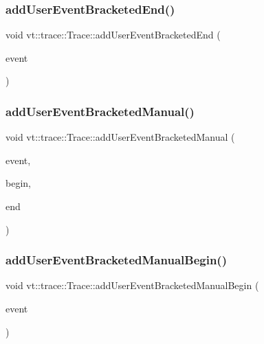 \subsubsection{\texorpdfstring{add\+User\+Event\+Bracketed\+End()}{addUserEventBracketedEnd()}}
{\footnotesize\ttfamily void vt\+::trace\+::\+Trace\+::add\+User\+Event\+Bracketed\+End (\begin{DoxyParamCaption}\item[{\hyperlink{namespacevt_1_1trace_a5908920d051c144c89f17c69ed262350}{User\+Event\+I\+D\+Type}}]{event }\end{DoxyParamCaption})}

\mbox{\label{structvt_1_1trace_1_1_trace_ab0dd676ca3870682b0c52669d3603c11}} 
\subsubsection{\texorpdfstring{add\+User\+Event\+Bracketed\+Manual()}{addUserEventBracketedManual()}}
{\footnotesize\ttfamily void vt\+::trace\+::\+Trace\+::add\+User\+Event\+Bracketed\+Manual (\begin{DoxyParamCaption}\item[{\hyperlink{namespacevt_1_1trace_a70c43e0e1596eea236912d4197d3120a}{User\+Spec\+Event\+I\+D\+Type}}]{event,  }\item[{double}]{begin,  }\item[{double}]{end }\end{DoxyParamCaption})}

\mbox{\label{structvt_1_1trace_1_1_trace_ab6def24560e35a011beb771b2a05894c}} 
\subsubsection{\texorpdfstring{add\+User\+Event\+Bracketed\+Manual\+Begin()}{addUserEventBracketedManualBegin()}}
{\footnotesize\ttfamily void vt\+::trace\+::\+Trace\+::add\+User\+Event\+Bracketed\+Manual\+Begin (\begin{DoxyParamCaption}\item[{\hyperlink{namespacevt_1_1trace_a70c43e0e1596eea236912d4197d3120a}{User\+Spec\+Event\+I\+D\+Type}}]{event }\end{DoxyParamCaption})}

